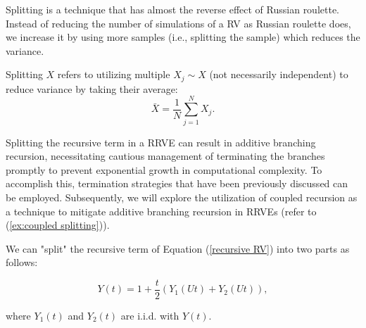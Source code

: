 \documentclass[a4paper,12pt]{article}
\begin{document}
Splitting is a technique that has almost the reverse effect of Russian roulette.
Instead of reducing the number of simulations of a RV as Russian roulette does,
we increase it by using more samples (i.e., splitting the sample) which
reduces the variance.

\begin{definition}[splitting] \label{def:splitting}
    Splitting $X$ refers to utilizing multiple $X_{j} \sim X$ (not necessarily independent) to
    reduce variance by taking their average:
    \begin{equation}
        \bar{X} = \frac{1}{N} \sum_{j=1}^{N} X_{j}.
    \end{equation}
\end{definition}

Splitting the recursive term in a RRVE can result in additive branching recursion,
necessitating cautious management of terminating the branches promptly to prevent
exponential growth in computational complexity. To accomplish this, termination
strategies that have been previously discussed can be employed. Subsequently,
we will explore the utilization of coupled recursion as a technique to mitigate
additive branching recursion in RRVEs (refer to (\ref{ex:coupled splitting})).

\begin{example} \label{ex:splitting}
    We can "split" the recursive term of Equation (\ref{recursive RV})
    into two parts as follows:

    \begin{equation}
        Y(t) = 1 + \frac{t}{2}(Y_{1}(Ut) + Y_{2}(Ut)),
    \end{equation}

    where $Y_{1}(t)$ and $Y_{2}(t)$ are i.i.d. with $Y(t)$.
\end{example}

\vspace{0.2cm}

\begin{pythonn}
\end{pythonn}

\end{document}
